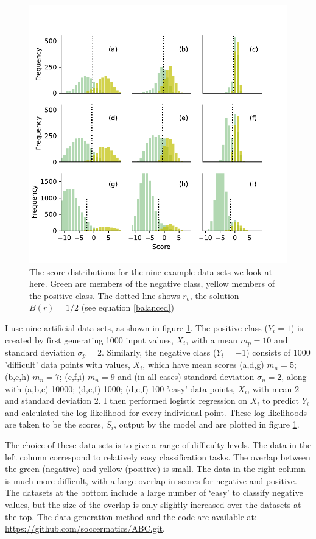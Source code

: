 \documentclass[preprint,12pt]{elsarticle}
\begin{document}
\begin{figure}[t]
\centering
\includegraphics[scale=1]{Article/Figures/Distribution.pdf}
\caption{The score distributions for the nine example data sets we look at here. Green are members of the negative class, yellow members of the positive class. The dotted line shows $r_b$, the solution $B(r)=1/2$ (see equation \ref{balanced})} \label{fig:Distribution}
\end{figure}

I use nine artificial data sets, as shown in figure \ref{fig:Distribution}. The positive class ($Y_i=1$) is created by first generating 1000 input values, $X_i$, with a mean $m_p=10$ and standard deviation $\sigma_p=2$. Similarly, the negative class ($Y_i=-1$) consists of 1000 'difficult' data points with values, $X_i$, which have mean scores (a,d,g) $m_n=5$; (b,e,h) $m_n=7$; (c,f,i) $m_n=9$ and (in all cases) standard deviation $\sigma_n=2$, along with (a,b,c) 10000; (d,e,f) 1000; (d,e,f) 100 'easy' data points, $X_i$, with mean 2 and standard deviation 2.  I then performed logistic regression on $X_i$ to predict $Y_i$ and calculated the log-likelihood for every individual point. These log-likelihoods are taken to be the scores, $S_i$, output by the model and are plotted in figure \ref{fig:Distribution}. 

The choice of these data sets is to give a range of difficulty levels. The data in the left column correspond to relatively easy classification tasks. The overlap between the green (negative) and yellow (positive) is small. The data in the right column is much more difficult, with a large overlap in scores for negative and positive. The datasets at the bottom include a large number of `easy' to classify negative values, but the size of the overlap is only slightly increased over the datasets at the top. The data generation method and the code are available at: \href{https://github.com/soccermatics/ABC.git}{https://github.com/soccermatics/ABC.git}. 
\end{document}
